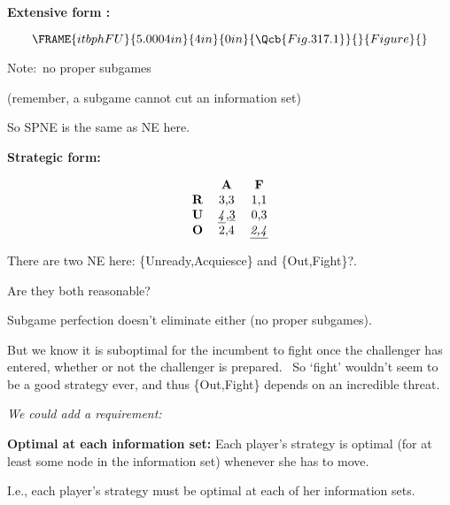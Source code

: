 \documentclass{article}
\begin{document}
\textbf{Extensive form :\bigskip }

\begin{equation}
\FRAME{itbphFU}{5.0004in}{4in}{0in}{\Qcb{Fig. 317.1}}{}{Figure}{\special%
{language "Scientific Word";type "GRAPHIC";maintain-aspect-ratio
TRUE;display "USEDEF";valid_file "T";width 5.0004in;height 4in;depth
0in;original-width 5.6886in;original-height 3.5201in;cropleft "0";croptop
"1";cropright "1";cropbottom "0";tempfilename
'JSH1WT06.wmf';tempfile-properties "XPR";}}
\end{equation}

Note:\ no proper subgames

(remember, a subgame cannot cut an information set)

So SPNE is the same as NE here.

\bigskip

\textbf{Strategic form:}

\begin{equation}
\begin{tabular}{ccc}
& \textbf{A} & \textbf{F} \\ 
\textbf{R} & 3,3 & 1,1 \\ 
\textbf{U} & \underline{\textit{4}},\underline{3} & 0,3 \\ 
\textbf{O} & 2,4 & \underline{\textit{2,4}}%
\end{tabular}%
\end{equation}

\bigskip

There are two NE here: \{Unready,Acquiesce\} and \{Out,Fight\}?.\ 

Are they both reasonable?

\bigskip

Subgame perfection doesn't eliminate either (no proper subgames).

\bigskip

But we know it is suboptimal for the incumbent to fight once the challenger
has entered, whether or not the challenger is prepared. \ So `fight'
wouldn't seem to be a good strategy ever, and thus \{Out,Fight\} depends on
an incredible threat.

\bigskip

\textit{We could add a requirement:}

\textbf{Optimal at each information set:} Each player's strategy is optimal
(for at least some node in the information set) whenever she has to move.

I.e., each player's strategy must be optimal at each of her information sets.
\end{document}
